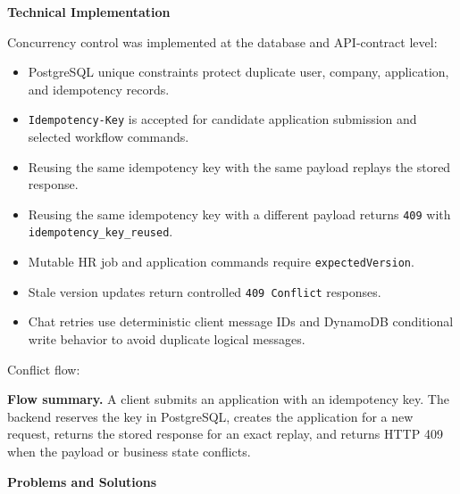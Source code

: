 \vspace{0.5em}\noindent\textbf{Technical Implementation}\par

Concurrency control was implemented at the database and API-contract
level:

\begin{itemize}
\tightlist
\item
  PostgreSQL unique constraints protect duplicate user, company,
  application, and idempotency records.
\item
  \texttt{Idempotency-\allowbreak{}Key} is accepted for candidate application
  submission and selected workflow commands.
\item
  Reusing the same idempotency key with the same payload replays the
  stored response.
\item
  Reusing the same idempotency key with a different payload returns
  \texttt{409} with \texttt{idempotency\_\allowbreak{}key\_\allowbreak{}reused}.
\item
  Mutable HR job and application commands require
  \texttt{expectedVersion}.
\item
  Stale version updates return controlled \texttt{409\ Conflict}
  responses.
\item
  Chat retries use deterministic client message IDs and DynamoDB
  conditional write behavior to avoid duplicate logical messages.
\end{itemize}

Conflict flow:

\textbf{Flow summary.} A client submits an application with an
idempotency key. The backend reserves the key in PostgreSQL, creates the
application for a new request, returns the stored response for an exact
replay, and returns HTTP 409 when the payload or business state
conflicts.

\vspace{0.5em}\noindent\textbf{Problems and Solutions}\par

